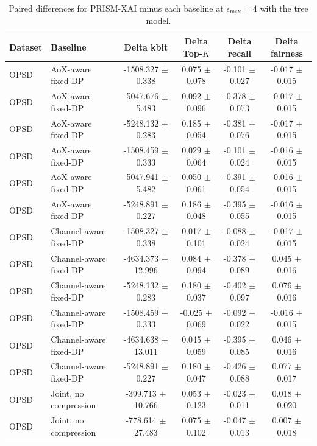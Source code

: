 \begin{table}[t]
\caption{Paired differences for PRISM-XAI minus each baseline at $\epsilon_{\max}=4$ with the tree model.}
\label{tab:paired-differences}
\centering
\scriptsize
\setlength{\tabcolsep}{3pt}
\begin{tabular}{llcccc}
\toprule
Dataset & Baseline & Delta kbit & Delta Top-$K$ & Delta recall & Delta fairness \\
\midrule
OPSD & AoX-aware fixed-DP & -1508.327 $\pm$ 0.338 & 0.075 $\pm$ 0.078 & -0.101 $\pm$ 0.027 & -0.017 $\pm$ 0.015 \\
OPSD & AoX-aware fixed-DP & -5047.676 $\pm$ 5.483 & 0.092 $\pm$ 0.096 & -0.378 $\pm$ 0.073 & -0.017 $\pm$ 0.015 \\
OPSD & AoX-aware fixed-DP & -5248.132 $\pm$ 0.283 & 0.185 $\pm$ 0.054 & -0.381 $\pm$ 0.076 & -0.017 $\pm$ 0.015 \\
OPSD & AoX-aware fixed-DP & -1508.459 $\pm$ 0.333 & 0.029 $\pm$ 0.064 & -0.101 $\pm$ 0.024 & -0.016 $\pm$ 0.015 \\
OPSD & AoX-aware fixed-DP & -5047.941 $\pm$ 5.482 & 0.050 $\pm$ 0.061 & -0.391 $\pm$ 0.054 & -0.016 $\pm$ 0.015 \\
OPSD & AoX-aware fixed-DP & -5248.891 $\pm$ 0.227 & 0.186 $\pm$ 0.048 & -0.395 $\pm$ 0.055 & -0.016 $\pm$ 0.015 \\
OPSD & Channel-aware fixed-DP & -1508.327 $\pm$ 0.338 & 0.017 $\pm$ 0.101 & -0.088 $\pm$ 0.024 & -0.017 $\pm$ 0.015 \\
OPSD & Channel-aware fixed-DP & -4634.373 $\pm$ 12.996 & 0.084 $\pm$ 0.094 & -0.378 $\pm$ 0.089 & 0.045 $\pm$ 0.016 \\
OPSD & Channel-aware fixed-DP & -5248.132 $\pm$ 0.283 & 0.180 $\pm$ 0.037 & -0.402 $\pm$ 0.097 & 0.076 $\pm$ 0.016 \\
OPSD & Channel-aware fixed-DP & -1508.459 $\pm$ 0.333 & -0.025 $\pm$ 0.069 & -0.092 $\pm$ 0.022 & -0.016 $\pm$ 0.015 \\
OPSD & Channel-aware fixed-DP & -4634.638 $\pm$ 13.011 & 0.045 $\pm$ 0.059 & -0.395 $\pm$ 0.085 & 0.046 $\pm$ 0.016 \\
OPSD & Channel-aware fixed-DP & -5248.891 $\pm$ 0.227 & 0.180 $\pm$ 0.047 & -0.426 $\pm$ 0.088 & 0.077 $\pm$ 0.017 \\
OPSD & Joint, no compression & -399.713 $\pm$ 10.766 & 0.053 $\pm$ 0.123 & -0.023 $\pm$ 0.011 & 0.018 $\pm$ 0.020 \\
OPSD & Joint, no compression & -778.614 $\pm$ 27.483 & 0.075 $\pm$ 0.102 & -0.047 $\pm$ 0.013 & 0.007 $\pm$ 0.018 \\

\end{tabular}
\end{table}
